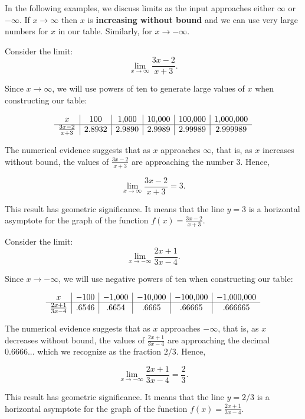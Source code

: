 \documentclass{ximera}
\begin{document}
In the following examples, we discuss limits as the input approaches either $\infty$ or $-\infty$.
If $x \to \infty$ then $x$ is \textbf{increasing without bound} and we can use very large numbers for $x$ in our table.
Similarly, for $x \to -\infty$.

\begin{example}[example 8]
Consider the limit:
\[\lim_{x \to \infty} \frac{3x -2}{x + 3}. \]

Since $x \to \infty$, we will use powers of ten to generate large values of $x$ when constructing 
our table: 

\[
\begin{array}{ c | c | c | c | c|c}
  x & 100 & 1{,}000 & 10{,}000 & 100{,}000 & 1{,}000{,}000\\ 
	\hline
	 \frac{3x-2}{x+3} & 2.8932 & 2.9890 & 2.9989 & 2.99989 & 2.999989
	\end{array}
\] 

The numerical evidence suggests that as $x$ approaches $\infty$, that is, 
as $x$ increases without bound, the values of $\frac{3x -2}{x +3}$ are approaching the number $3$. Hence,



\[\lim_{x \to \infty} \frac{3x -2}{x +3} = 3. \]

This result has geometric significance.  It means that the line $y = 3$ is a horizontal 
asymptote for the graph of the function $f(x) = \frac{3x -2}{x +3}.$
\end{example}


\begin{example}[example 9]
Consider the limit:
\[\lim_{x \to -\infty} \frac{2x + 1}{3x -4}. \]

Since $x \to -\infty$, we will use negative powers of ten when constructing 
our table: 

\[
\begin{array}{ c | c | c | c | c |c}
  x & -100 & -1{,}000 & -10{,}000 & -100{,}000 & -1{,}000{,}000\\ 
	\hline
	 \frac{2x + 1}{3x -4} &  .6546 & .6654 & .6665 & .66665  & .666665
	\end{array}
\] 

The numerical evidence suggests that as $x$ approaches $-\infty$, that is, 
as $x$ decreases without bound, the values of $\frac{2x + 1}{3x -4}$ are approaching 
the decimal $0.6666...$ which we recognize as the fraction $2/3$.  Hence,



\[\lim_{x \to -\infty} \frac{2x + 1}{3x -4} = \frac{2}{3}. \]

This result has geometric significance.  It means that the line $y = 2/3$ is a horizontal 
asymptote for the graph of the function $f(x) = \frac{2x + 1}{3x -4}.$
\end{example}
\end{document}
